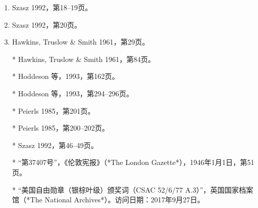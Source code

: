 \begin{enumerate}
\item Szasz 1992，第18–19页。

\item Szasz 1992，第20页。

\item Hawkins, Truslow & Smith 1961，第29页。

* Hawkins, Truslow & Smith 1961，第84页。

* Hoddeson 等，1993，第162页。

* Hoddeson 等，1993，第294–296页。

* Peierls 1985，第201页。

* Peierls 1985，第200–202页。

* Szasz 1992，第46–49页。

* “第37407号”，《伦敦宪报》（*The London Gazette*），1946年1月1日，第51页。

* “美国自由勋章（银棕叶级）颁奖词（CSAC 52/6/77 A.3）”，英国国家档案馆（*The National Archives*）。访问日期：2017年9月27日。

\end{enumerate}
